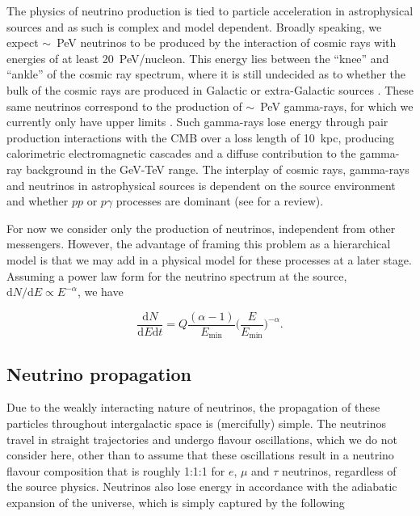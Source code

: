 \documentclass[fontsize=12pt]{article}
\begin{document}
The physics of neutrino production is tied to particle acceleration in astrophysical sources and as such is complex and model dependent. Broadly speaking, we expect $\sim$~PeV neutrinos to be produced by the interaction of cosmic rays with energies of at least 20~PeV/nucleon. This energy lies between the ``knee'' and ``ankle'' of the cosmic ray spectrum, where it is still undecided as to whether the bulk of the cosmic rays are produced in Galactic or extra-Galactic sources \cite{Aloisio:2012ff}. These same neutrinos correspond to the production of $\sim$~PeV gamma-rays, for which we currently only have upper limits \cite{Ahlers:2014ks, Aartsen:2013dg}. Such gamma-rays lose energy through pair production interactions with the CMB over a loss length of 10~kpc, producing calorimetric electromagnetic cascades and a diffuse contribution to the gamma-ray background in the GeV-TeV range. The interplay of cosmic rays, gamma-rays and neutrinos in astrophysical sources is dependent on the source environment and whether $pp$ or $p\gamma$ processes are dominant (see \cite{Meszaros:2017hm} for a review).

For now we consider only the production of neutrinos, independent from other messengers. However, the advantage of framing this problem as a hierarchical model is that we may add in a physical model for these processes at a later stage. Assuming a power law form for the neutrino spectrum at the source, $\mathrm{d}N/\mathrm{d}E \propto E^{-\alpha}$, we have

\begin{equation}
\frac{\mathrm{d}N}{\mathrm{d}E\mathrm{d}t} = Q \frac{(\alpha - 1)}{E_\mathrm{min}} \Bigg( \frac{E}{E_\mathrm{min}} \Bigg)^{-\alpha}.
\end{equation}

\subsection{Neutrino propagation}

Due to the weakly interacting nature of neutrinos, the propagation of these particles throughout intergalactic space is (mercifully) simple. The neutrinos travel in straight trajectories and undergo flavour oscillations, which we do not consider here, other than to assume that these oscillations result in a neutrino flavour composition that is roughly 1:1:1 for $e$, $\mu$ and $\tau$
 neutrinos, regardless of the source physics. Neutrinos also lose energy in accordance with the adiabatic expansion of the universe, which is simply captured by the following
 
\end{document}
